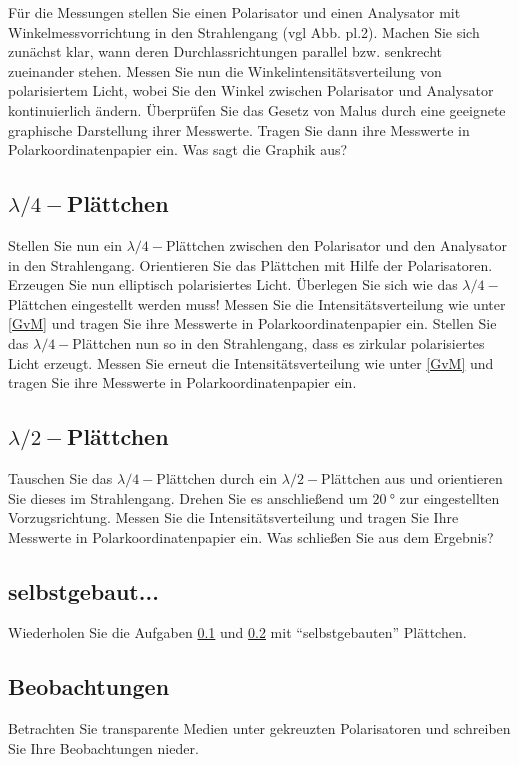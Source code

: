 Für die Messungen stellen Sie einen Polarisator und einen Analysator mit Winkelmessvorrichtung in den Strahlengang (vgl Abb. pl.2). Machen Sie sich zunächst klar, wann deren Durchlassrichtungen parallel bzw. senkrecht zueinander stehen. Messen Sie nun die Winkelintensitätsverteilung von polarisiertem Licht, wobei Sie den Winkel zwischen Polarisator und Analysator kontinuierlich ändern. Überprüfen Sie das Gesetz von Malus durch eine geeignete graphische Darstellung ihrer Messwerte. Tragen Sie dann ihre Messwerte in Polarkoordinatenpapier ein. Was sagt die Graphik aus?
\subsection{$\lambda/4-$Plättchen}\label{4tel}
Stellen Sie nun ein $\lambda/4-$Plättchen zwischen den Polarisator und den Analysator in den Strahlengang. Orientieren Sie das Plättchen mit Hilfe der Polarisatoren. Erzeugen Sie nun elliptisch polarisiertes Licht. Überlegen Sie sich wie das $\lambda/4-$Plättchen eingestellt werden muss! Messen Sie die Intensitätsverteilung wie unter \ref{GvM} und tragen Sie ihre Messwerte in Polarkoordinatenpapier ein. Stellen Sie das $\lambda/4-$Plättchen nun so in den Strahlengang, dass es zirkular polarisiertes Licht erzeugt. Messen Sie erneut die Intensitätsverteilung wie unter \ref{GvM} und tragen Sie ihre Messwerte in Polarkoordinatenpapier ein.
\subsection{$\lambda/2-$Plättchen}\label{halb}
Tauschen Sie das $\lambda/4-$Plättchen durch ein $\lambda/2-$Plättchen aus und orientieren Sie dieses im Strahlengang. Drehen Sie es anschließend um $\SI{20}{\degree}$ zur eingestellten Vorzugsrichtung. Messen Sie die Intensitätsverteilung und tragen Sie Ihre Messwerte in Polarkoordinatenpapier ein. Was schließen Sie aus dem Ergebnis?
\subsection{selbstgebaut...}
Wiederholen Sie die Aufgaben \ref{4tel} und \ref{halb} mit "`selbstgebauten"' Plättchen.
\subsection{Beobachtungen}
Betrachten Sie transparente Medien unter gekreuzten Polarisatoren und schreiben Sie Ihre Beobachtungen nieder.